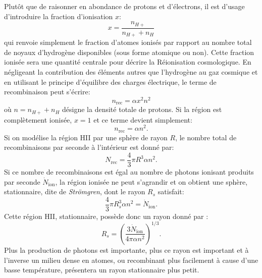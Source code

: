 Plutôt que de raisonner en abondance de protons et d'électrons, il est d'usage d'introduire la fraction d'ionisation $x$:
\begin{equation}
x=\frac{n_{H+}}{n_{H+}+n_H}
\end{equation}
qui renvoie simplement le fraction d'atomes ionisés par rapport au nombre total de noyaux d'hydrogène disponibles (sous forme atomique ou non). Cette fraction ionisée sera une quantité centrale pour décrire la Réionisation cosmologique. En négligeant la contribution des éléments autres que l'hydrogène au gaz cosmique et en utilisant le principe d'équilibre des charges électrique, le terme de recombinaison peut s'écrire:
\begin{equation}
n_\mathrm{rec}=\alpha x^2 n^2
\end{equation}
où $n=n_{H+}+n_H$ désigne la densité totale de protons. Si la région est complètement ionisée, $x=1$ et ce terme devient simplement:
\begin{equation}
n_\mathrm{rec}=\alpha n^2.
\end{equation}
Si on modélise la région HII par une sphère de rayon $R$, le nombre total de recombinaisons par seconde à l'intérieur est donné par:
\begin{equation}
N_\mathrm{rec}=\frac{4}{3}\pi R^3\alpha n^2.
\end{equation}
Si ce nombre de recombinaisons est égal au nombre de photons ionisant produits par seconde $ \dot N_\mathrm{ion}$, la région ionisée ne peut s'agrandir et on obtient une sphère, stationnaire, dite de \textit{Strömgren}, dont le rayon $R_s$ satisfait:
\begin{equation}
\frac{4}{3}\pi R_s^3\alpha n^2=\dot N_\mathrm{ion}.
\end{equation}
Cette région HII, stationnaire, possède donc un rayon donné par :
\begin{equation}
R_s=\left(\frac{3 \dot N_\mathrm{ion}}{4\pi \alpha n^2}\right)^{1/3}.
\end{equation}
Plus la production de photons est importante, plus ce rayon est important et à l'inverse un milieu dense en atomes, ou recombinant plus facilement à cause d'une basse température, présentera un rayon stationnaire plus petit.

